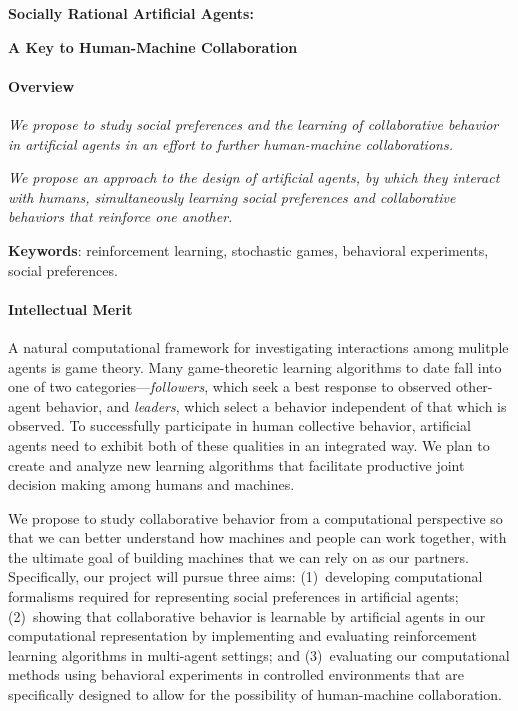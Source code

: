 
\centerline{\Large \bf Socially Rational Artificial Agents:}

\vspace{\down}
\centerline{\large \bf A Key to Human-Machine Collaboration}

\vspace{\up}
\paragraph{Overview}

\emph{We propose to study social preferences and the learning of collaborative behavior in artificial agents in an effort to further human-machine collaborations.}

\emph{We propose an approach to the design of artificial agents,
by which they interact with humans, simultaneously learning social
preferences and collaborative behaviors that reinforce one another.}


{\bf Keywords}: reinforcement learning, stochastic games, behavioral experiments, social preferences.

\vspace{\up}
\paragraph{Intellectual Merit}

A natural computational framework for investigating interactions among
mulitple agents is game theory. Many game-theoretic learning
algorithms to date fall into one of two categories---\emph{followers},
which seek a best response to observed other-agent behavior,
and \emph{leaders}, which select a behavior independent of that which
is observed. To successfully participate in human collective behavior,
artificial agents need to exhibit both of these qualities in an
integrated way. We plan to create and analyze new learning algorithms
that facilitate productive joint decision making among humans and
machines.


We propose to study collaborative behavior from a computational perspective so
that we can better understand how machines and people can work
together, with the ultimate goal of building machines that we can rely
on as our partners. Specifically, our project will pursue three aims:
%
(1)~developing computational formalisms required for representing
social preferences in artificial agents; (2)~showing that
collaborative behavior is learnable by artificial agents in our
computational representation by implementing and evaluating
reinforcement learning algorithms in multi-agent settings; and
(3)~evaluating our computational methods using behavioral experiments
in controlled environments that are specifically designed to allow for
the possibility of human-machine collaboration.


